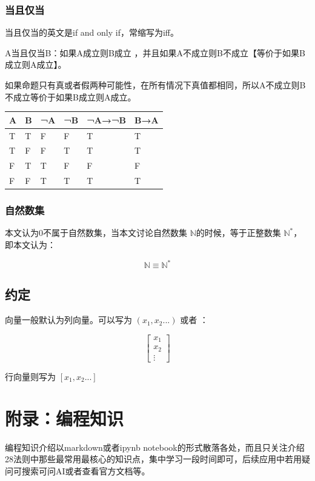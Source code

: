 \documentclass[12pt,oneside]{book}
\begin{document}
\section{当且仅当}
当且仅当的英文是if and only if，常缩写为iff。

A当且仅当B：如果A成立则B成立 ，并且如果A不成立则B不成立【等价于如果B成立则A成立】。

如果命题只有真或者假两种可能性，在所有情况下真值都相同，所以A不成立则B不成立等价于如果B成立则A成立。

\begin{table}[H]
\begin{tabular}{@{}llllll@{}}
\toprule
{A} & {B} & {¬A} & {¬B} & {¬A→¬B} & {B→A} \\ \midrule

{T}          & {T} & {F}  & {F}  & {T}     & {T}   \\
\rowcolor[HTML]{FFFFFF} 
{T}          & {F} & {F}  & {T}  & {T}     & {T}   \\
\rowcolor[HTML]{FFFFFF} 
{F}          & {T} & {T}  & {F}  & {F}     & {F}   \\
\rowcolor[HTML]{FFFFFF} 
{F}          & {F} & {T}  & {T}  & {T}     & {T}   \\ \bottomrule
\end{tabular}
\end{table}


\section{自然数集}
本文认为0不属于自然数集，当本文讨论自然数集 $ \mathbb{N} $的时候，等于正整数集 $\mathbb{N}^{*}$，即本文认为：

\[
\mathbb{N} \equiv \mathbb{N}^{*}
\]


\chapter{约定}
向量一般默认为列向量。可以写为 $(x_1, x_2...)$ 或者 ：

\[
\begin{bmatrix}x_{1}  \\ x_2 \\ \vdots \end{bmatrix}
\]

行向量则写为 $[x_1, x_2...]$


\part{附录：编程知识}
编程知识介绍以markdown或者ipynb notebook的形式散落各处，而且只关注介绍28法则中那些最常用最核心的知识点，集中学习一段时间即可，后续应用中若用疑问可搜索可问AI或者查看官方文档等。
\end{document}
